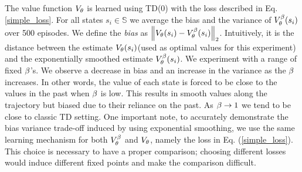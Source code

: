 The value function $V_{\theta}$ is learned using TD(0) with the loss described in Eq. \ref{simple_loss}. For all states $s_i \in \mathbb{S}$ we average the bias and the variance of $V^{\beta}_{\theta}(s_i)$ over 500 episodes. We define the \emph{bias} as $\left\lVert V_{\theta}(s_i) - V^{\beta}_{\theta}(s_i)\right\rVert_{2}$. Intuitively, it is the distance between the estimate $V_{\theta}(s_i)$(used as optimal values for this experiment) and the exponentially smoothed estimate $V^{\beta}_{\theta}(s_i)$. We experiment with a range of fixed $\beta$'s. We observe a decrease in bias and an increase in the variance as the $\beta$ increases. In other words, the value of each state is forced to be close to the values in the past when $\beta$ is low. This results in smooth values along the trajectory but biased due to their reliance on the past. As $\beta \to 1$ we tend to be close to classic TD setting. One important note, to accurately demonstrate the bias variance trade-off induced by using exponential smoothing, we use the same learning mechanism for both $V^{\beta}_{\theta}$ and $V_{\theta}$, namely the loss in Eq. (\ref{simple_loss}). This choice is necessary to have a proper comparison; choosing different losses would induce different fixed points and make the comparison difficult.



